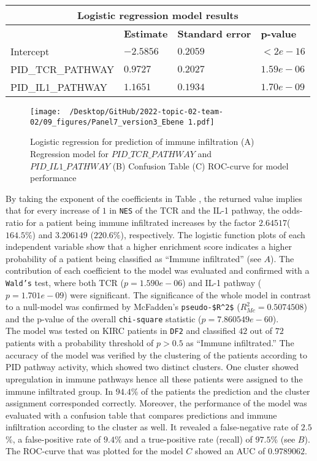 \documentclass[
  parskip,
  oneside]{scrreprt}
\begin{document}
\begin{table}[ht]
 \begin{tabular}{ |p{4.5cm}||p{3cm}|p{3cm}|p{3cm}|  }
  \hline
  \multicolumn{4}{|c|}{Logistic regression model results} \\
  \hline
   & \textbf{Estimate} & \textbf{Standard error} & \textbf{p-value}\\
  \hline
  Intercept   &  $-2.5856$  & $0.2059$ &   $<2e-16$\\
  PID\_TCR\_PATHWAY &   $0.9727$  & $0.2027$   & $1.59e-06$\\
  PID\_IL1\_PATHWAY & $1.1651$ & $0.1934$ &  $1.70e-09$\\
 \hline
 \end{tabular}
 \label{tab}
\end{table}

\begin{figure}[t]
  \texttt{[image: ~/Desktop/GitHub/2022-topic-02-team-02/09\_figures/Panel7\_version3\_Ebene 1.pdf]}
  \caption{Logistic regression for prediction of immune infiltration (A) Regression model for $PID\_TCR\_PATHWAY$ and $PID\_IL1\_PATHWAY$ (B) Confusion Table (C) ROC-curve for model performance}
  \label{log}
\end{figure}

By taking the exponent of the coefficients in Table , the
returned value implies that for every increase of \(1\) in \texttt{NES}
of the TCR and the IL-1 pathway, the odds-ratio for a patient being
immune infiltrated increases by the factor \(2.64517\)(\(164.5\%\)) and
\(3.206149\) (\(220.6\%\)), respectively. The logistic function plots of
each independent variable show that a higher enrichment score indicates
a higher probability of a patient being classified as ``Immune
infiltrated'' (see  \(A\)). The contribution of each
coefficient to the model was evaluated and confirmed with a
\texttt{Wald’s} test, where both TCR (\(p= 1.590e-06\)) and IL-1 pathway
(\(p= 1.701e-09\)) were significant. The significance of the whole model
in contrast to a null-model was confirmed by McFadden's
\texttt{pseudo-\$R\^{}2\$} (\(R_{Mc}^2=0.5074508\)) and the p-value of
the overall \texttt{chi-square} statistic (\(p=7.860549e-60\)).\\
The model was tested on KIRC patients in \texttt{DF2} and classified
\(42\) out of \(72\) patients with a probability threshold of
\(p > 0.5\) as ``Immune infiltrated.'' The accuracy of the model was
verified by the clustering of the patients according to PID pathway
activity, which showed two distinct clusters. One cluster showed
upregulation in immune pathways hence all these patients were assigned
to the immune infiltrated group. In \(94.4\)\% of the patients the
prediction and the cluster assignment corresponded correctly. Moreover,
the performance of the model was evaluated with a confusion table that
compares predictions and immune infiltration according to the cluster as
well. It revealed a false-negative rate of \(2.5\)\%, a false-positive
rate of \(9.4\)\% and a true-positive rate (recall) of \(97.5\)\% (see
 \(B\)). The ROC-curve that was plotted for the model
\(C\) showed an AUC of \(0.9789062\).
\end{document}
